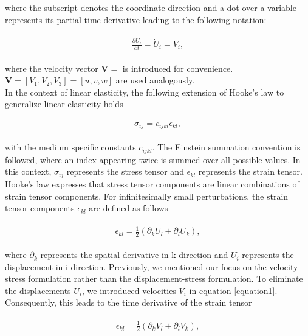 where the subscript denotes the coordinate direction and a dot over a variable represents its partial time derivative leading to the following notation:

\begin{align}
    \begin{split}
        \frac{\partial U_i}{\partial t} = \dot{U}_i = V_i,
    \end{split}
    \label{equation1}
\end{align}

where the velocity vector $\mathbf{V} = $ is introduced for convenience. $\mathbf{V} = [V_1, V_2, V_3] = [u, v ,w]$ are used analogously. \\

In the context of linear elasticity, the following extension of Hooke's law  to generalize linear elasticity holds

\begin{align}
    \begin{split}
        \sigma_{ij} = c_{ijkl}\epsilon_{kl},
    \end{split}
    \label{eq:hookeslaw}
\end{align}

with the medium specific constants $c_{ijkl}$. The Einstein summation convention
is followed, where an index appearing twice is summed over all possible values. In this context, $\sigma_{ij}$ represents the stress tensor
and $\epsilon_{kl}$ represents the strain tensor. Hooke's law expresses that stress tensor components are linear combinations of strain tensor
components. For infinitesimally small perturbations, the strain tensor components $\epsilon_{kl}$ are defined as follows

\begin{align}
    \begin{split}
        \epsilon_{kl} = \frac{1}{2}\left(\partial_k U_l + \partial_l U_k \right) ,
    \end{split}
\end{align}

where $\partial_k$ represents the spatial derivative in k-direction and $U_i$ represents the displacement in i-direction.
Previously, we mentioned our focus on the velocity-stress formulation rather than the displacement-stress formulation.
To eliminate the displacements $U_i$, we introduced velocities $V_i$ in equation \ref{equation1}.
Consequently, this leads to the time derivative of the strain tensor

\begin{align}
    \begin{split}
        \dot{\epsilon}_{kl} = \frac{1}{2}\left( \partial_k V_l + \partial_l V_k \right) ,
    \end{split}
\end{align}

